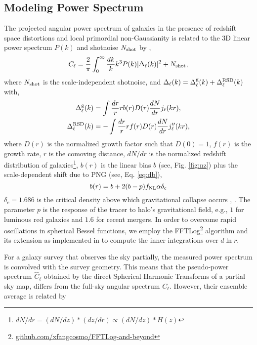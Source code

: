 \subsection{Modeling Power Spectrum}
The projected angular power spectrum of galaxies in the presence of redshift space distortions and local primordial non-Gaussianity is related to the 3D linear power spectrum $P(k)$ and shotnoise $N_{\rm shot}$ by \citep[see, e.g.,][]{Padmanabhan2007},
\begin{equation}\label{eq:cell}
    C_{\ell} = \frac{2}{\pi}\int_{0}^{\infty}\frac{dk}{k}k^{3}P(k)|\Delta_{\ell}(k)|^{2} + N_{\rm shot},
\end{equation}
where $N_{\rm shot}$ is the scale-independent shotnoise, and $\Delta_{\ell}(k) = \Delta^{\rm g}_{\ell}(k) + \Delta^{\rm RSD}_{\ell}(k)$ with,
\begin{align}
    \Delta^{\rm g}_{\ell}(k) &= \int \frac{dr}{r} r b(r) D(r) \frac{dN}{dr} j_{\ell}(kr),\\
    \Delta^{\rm RSD}_{\ell}(k) &= - \int \frac{dr}{r} r f(r) D(r) \frac{dN}{dr} j^{\prime\prime}_{\ell}(kr),
\end{align}
where $D(r)$ is the normalized growth factor such that $D(0)=1$, $f(r)$ is the growth rate, $r$ is the comoving distance, $dN/dr$ is the normalized redshift distribution of galaxies\footnote{$dN/dr = (dN/dz)*(dz/dr) \propto (dN/dz)*H(z)$}, $b(r)$ is the linear bias $b$ (see, Fig. \ref{fig:nz}) plus the scale-dependent shift due to PNG (see, Eq. \ref{eq:db}),
\begin{equation}
b(r) = b + 2 (b - p) f_{\rm NL} \alpha \delta_{c} 
\end{equation}
$\delta_{c}=1.686$ is the critical density above which gravitational collapse occurs , . The parameter $p$ is the response of the tracer to halo's gravitational field, e.g., $1$ for luminous red galaxies and $1.6$ for recent mergers. In order to overcome rapid oscillations in spherical Bessel functions, we employ the FFTLog\footnote{\href{https://github.com/xfangcosmo/FFTLog-and-beyond}{github.com/xfangcosmo/FFTLog-and-beyond}} algorithm and its extension as implemented in  to compute the inner integrations over $d\ln r$.

For a galaxy survey that observes the sky partially, the measured power spectrum is convolved with the survey geometry. This means that the pseudo-power spectrum $\hat{C}_{\ell}$ obtained by the direct Spherical Harmonic Transforms of a partial sky map, differs from the full-sky angular spectrum $C_{\ell}$. However, their ensemble average is related by \citep{hivonmaster2002ApJ...567....2H} 

